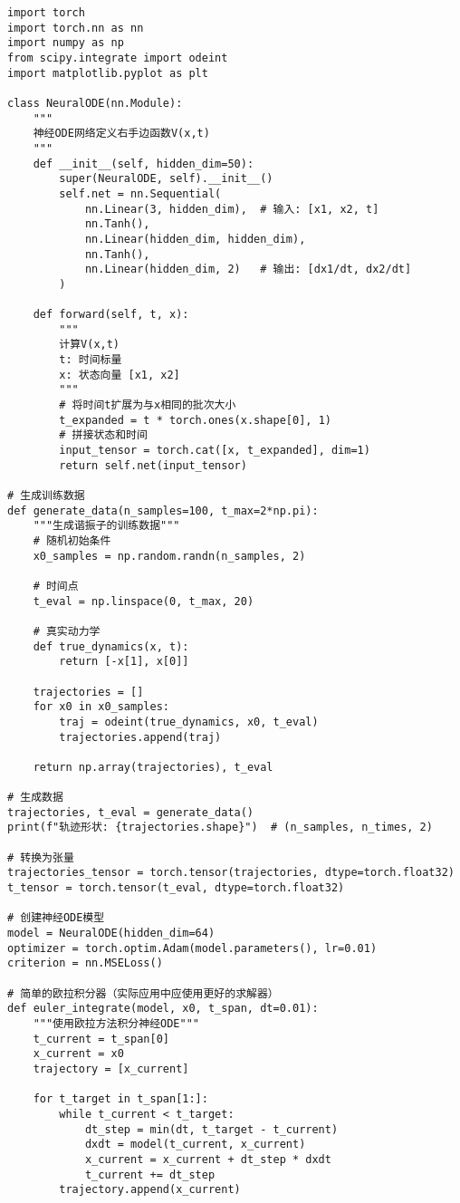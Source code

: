 \begin{lstlisting}[caption={神经ODE学习动力学系统的PyTorch实现}, label=code:neural_ode_example]
import torch
import torch.nn as nn
import numpy as np
from scipy.integrate import odeint
import matplotlib.pyplot as plt

class NeuralODE(nn.Module):
    """
    神经ODE网络定义右手边函数V(x,t)
    """
    def __init__(self, hidden_dim=50):
        super(NeuralODE, self).__init__()
        self.net = nn.Sequential(
            nn.Linear(3, hidden_dim),  # 输入: [x1, x2, t]
            nn.Tanh(),
            nn.Linear(hidden_dim, hidden_dim),
            nn.Tanh(),
            nn.Linear(hidden_dim, 2)   # 输出: [dx1/dt, dx2/dt]
        )
    
    def forward(self, t, x):
        """
        计算V(x,t)
        t: 时间标量
        x: 状态向量 [x1, x2]
        """
        # 将时间t扩展为与x相同的批次大小
        t_expanded = t * torch.ones(x.shape[0], 1)
        # 拼接状态和时间
        input_tensor = torch.cat([x, t_expanded], dim=1)
        return self.net(input_tensor)

# 生成训练数据
def generate_data(n_samples=100, t_max=2*np.pi):
    """生成谐振子的训练数据"""
    # 随机初始条件
    x0_samples = np.random.randn(n_samples, 2)
    
    # 时间点
    t_eval = np.linspace(0, t_max, 20)
    
    # 真实动力学
    def true_dynamics(x, t):
        return [-x[1], x[0]]
    
    trajectories = []
    for x0 in x0_samples:
        traj = odeint(true_dynamics, x0, t_eval)
        trajectories.append(traj)
    
    return np.array(trajectories), t_eval

# 生成数据
trajectories, t_eval = generate_data()
print(f"轨迹形状: {trajectories.shape}")  # (n_samples, n_times, 2)

# 转换为张量
trajectories_tensor = torch.tensor(trajectories, dtype=torch.float32)
t_tensor = torch.tensor(t_eval, dtype=torch.float32)

# 创建神经ODE模型
model = NeuralODE(hidden_dim=64)
optimizer = torch.optim.Adam(model.parameters(), lr=0.01)
criterion = nn.MSELoss()

# 简单的欧拉积分器（实际应用中应使用更好的求解器）
def euler_integrate(model, x0, t_span, dt=0.01):
    """使用欧拉方法积分神经ODE"""
    t_current = t_span[0]
    x_current = x0
    trajectory = [x_current]
    
    for t_target in t_span[1:]:
        while t_current < t_target:
            dt_step = min(dt, t_target - t_current)
            dxdt = model(t_current, x_current)
            x_current = x_current + dt_step * dxdt
            t_current += dt_step
        trajectory.append(x_current)
    

\end{lstlisting}
